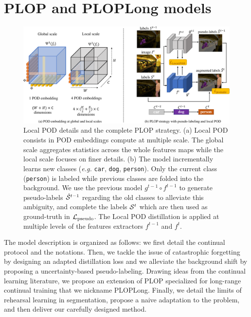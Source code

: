 \section{PLOP and PLOPLong models}
\label{sec:seg_plop}

\begin{figure}[ht!]
    \centering
    \includegraphics[width=\linewidth]{images/seg/plop_strategy.pdf}
    \caption{Local POD details and the complete PLOP strategy. (a) Local POD consists in POD
        embeddings compute at multiple scale. The global scale aggregates statistics across the
        whole features maps while the local scale focuses on finer details.  (b) The model
        incrementally learns new classes (\textit{e.g.} \texttt{car}, \texttt{dog},
        \texttt{person}). Only the current class (\texttt{person}) is labeled while previous classes
        are folded into the background. We use the previous model $g^{t-1} \circ f^{t-1}$ to
        generate pseudo-labels $\hat{\mathcal{S}}^{t-1}$ regarding the old classes to alleviate this
        ambiguity, and complete the labels $\mathcal{S}^t$ which are then used as ground-truth in
        $\mathcal{L}_\text{pseudo}$. The Local POD distillation is applied at multiple levels of the
        features extractors $f^{t-1}$ and $f^t$.}
    \label{fig:seg_model_plop}
\end{figure}


The model description is organized as follows: we first detail the continual protocol and the
notations. Then, we tackle the issue of catastrophic forgetting by designing an adapted distillation
loss and we alleviate the background shift by proposing a uncertainty-based pseudo-labeling. Drawing
ideas from the continual learning literature, we propose an extension of PLOP specialized for
long-range continual training that we nickname PLOPLong. Finally, we detail the limits of rehearsal
learning in segmentation, propose a naive adaptation to the problem, and then deliver our carefully
designed method.

